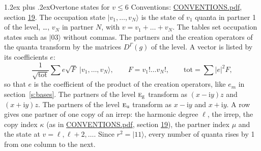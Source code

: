\documentclass[10pt,a4paper]{article}
\makeatletter
\renewcommand\section{\@startsection{section}{1}{\z@}{-3ex plus -1ex minus -.2ex}%
  {1.2ex plus .2ex}{\normalfont\large\sffamily\bfseries\color{parttitle}}}
\numberwithin{equation}{section}
\newcommand{\irr}[1]{\text{\normalfont\scshape #1}}
\newcommand{\ptag}[1]{\mathrm{#1}}
\newcommand{\iunit}{\mathrm{i}}
\newcommand{\repD}[1]{D^{#1}}
\newcommand{\mult}{\kappa}
\newcommand{\intx}{\mu}
\newcommand{\occ}[1]{\lvert #1\rangle}
\makeatother
\begin{document}
\section{Overtone states for \texorpdfstring{$v \le 6$}{v \textleq\ 6}}\label{s:overtone_states}
Conventions: \href{../../CONVENTIONS.pdf}{CONVENTIONS.pdf}, section \href{../../CONVENTIONS.pdf\#conv.19}{19}.
\leavevmode\label{n:vector.occupation}\label{n:local.quanta.partner}\label{n:local.weight.occupation}The occupation state $\occ{v_1, \dots, v_N}$ is the state of $v_1$ quanta in partner 1 of the level, \dots, $v_N$ in partner $N$, with $v = v_1 + \dots + v_N$. The tables set occupation states such as $\occ{03}$ without commas. The partners and the creation operators of the quanta transform by the matrices $\repD{\Gamma}(g)$ of the level. A vector is listed by its coefficients $e$:
\begin{equation}\label{e:occupation}\frac{1}{\sqrt{\mathrm{tot}}}\sum e\sqrt{F}\;\occ{v_1, \dots, v_N},\qquad F = v_1!\dots v_N!,\qquad \mathrm{tot} = \sum |e|^2F,\end{equation}
so that $e$ is the coefficient of the product of the creation operators, like $e_m$ in section~\ref{s:bases}. The partners of the level $\irr{e}_{\ptag{g}}$ transform as $(x - \iunit y) z$ and $(x + \iunit y) z$. The partners of the level $\irr{e}_{\ptag{u}}$ transform as $x - \iunit y$ and $x + \iunit y$. A row gives one partner of one copy of an irrep: the harmonic degree $\ell$, the irrep, the copy index $\mult$ (as in \href{../../CONVENTIONS.pdf}{CONVENTIONS.pdf}, section \href{../../CONVENTIONS.pdf\#conv.19}{19}), the partner index $\intx$ and the state at $v = \ell, \ell + 2, \dots$. Since $r^2 = \occ{11}$, every number of quanta rises by 1 from one column to the next.
\end{document}
